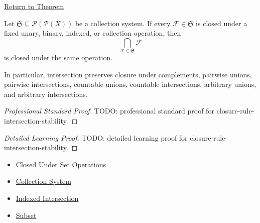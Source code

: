 \newpage
{}
\label{prf:closure-rule-intersection-stability}

\begin{remark*}[Return]
\hyperref[thm:closure-rule-intersection-stability]{Return to Theorem}
\end{remark*}

\begin{theorem*}
Let \(\mathfrak S\subseteq\mathcal P(\mathcal P(X))\) be a collection system.
If every \(\mathcal F\in\mathfrak S\) is closed under a fixed unary, binary,
indexed, or collection operation, then
\[
\bigcap_{\mathcal F\in\mathfrak S}\mathcal F
\]
is closed under the same operation.

In particular, intersection preserves closure under complements, pairwise
unions, pairwise intersections, countable unions, countable intersections,
arbitrary unions, and arbitrary intersections.
\end{theorem*}

\begin{proof}[Professional Standard Proof]
\LRAProofBodyStart
TODO: professional standard proof for closure-rule-intersection-stability.
\end{proof}

\begin{proof}[Detailed Learning Proof]
\LRAProofBodyStart
TODO: detailed learning proof for closure-rule-intersection-stability.
\end{proof}

\begin{remark*}
\end{remark*}

\begin{dependencies}
\begin{itemize}
  \item \hyperref[def:closed-under-set-operation-vocabulary]{Closed Under Set Operations}
  \item \hyperref[def:collection-system]{Collection System}
  \item \hyperref[def:indexed-intersection]{Indexed Intersection}
  \item \hyperref[def:subset]{Subset}
\end{itemize}
\end{dependencies}

\clearpage
